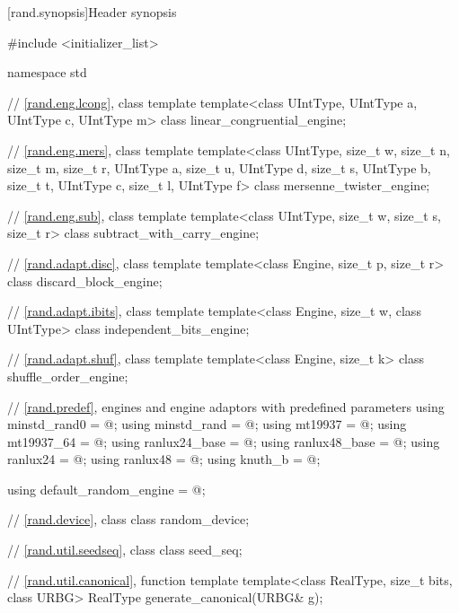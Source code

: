 [rand.synopsis]{Header  synopsis}%

\begin{codeblock}
#include <initializer_list>

namespace std {
  // \ref{rand.eng.lcong}, class template 
  template<class UIntType, UIntType a, UIntType c, UIntType m>
    class linear_congruential_engine;

  // \ref{rand.eng.mers}, class template 
  template<class UIntType, size_t w, size_t n, size_t m, size_t r,
           UIntType a, size_t u, UIntType d, size_t s,
           UIntType b, size_t t,
           UIntType c, size_t l, UIntType f>
    class mersenne_twister_engine;

  // \ref{rand.eng.sub}, class template 
  template<class UIntType, size_t w, size_t s, size_t r>
    class subtract_with_carry_engine;

  // \ref{rand.adapt.disc}, class template 
  template<class Engine, size_t p, size_t r>
    class discard_block_engine;

  // \ref{rand.adapt.ibits}, class template 
  template<class Engine, size_t w, class UIntType>
    class independent_bits_engine;

  // \ref{rand.adapt.shuf}, class template 
  template<class Engine, size_t k>
    class shuffle_order_engine;

  // \ref{rand.predef}, engines and engine adaptors with predefined parameters
  using minstd_rand0  = @\seebelow@;
  using minstd_rand   = @\seebelow@;
  using mt19937       = @\seebelow@;
  using mt19937_64    = @\seebelow@;
  using ranlux24_base = @\seebelow@;
  using ranlux48_base = @\seebelow@;
  using ranlux24      = @\seebelow@;
  using ranlux48      = @\seebelow@;
  using knuth_b       = @\seebelow@;

  using default_random_engine = @\seebelow@;

  // \ref{rand.device}, class 
  class random_device;

  // \ref{rand.util.seedseq}, class 
  class seed_seq;

  // \ref{rand.util.canonical}, function template 
  template<class RealType, size_t bits, class URBG>
    RealType generate_canonical(URBG& g);

}
\end{codeblock}
